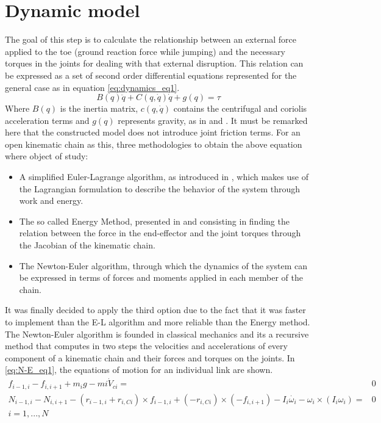 \section{Dynamic model}
\label{sec_dynamic_model}
The goal of this step is to calculate the relationship between an external force applied to the toe (ground reaction force while jumping) and the necessary torques in the joints for dealing with that external disruption.
This relation can be expressed as a set of second order differential equations represented for the general case as in equation \ref{eq:dynamics_eq1}. 
\begin{equation}
	\label{eq:dynamics_eq1}
	B(q)\ddot{q} + C(q,\dot{q})\dot{q} + g(q) = \tau
\end{equation}
Where $B(q)$ is the inertia matrix, $c(q,\dot{q})$ contains the centrifugal and coriolis acceleration terms and $g(q)$ represents gravity, as in \cite{dynamics1} and \cite{dynamics2}. 
It must be remarked here that the constructed model does not introduce joint friction terms.
For an open kinematic chain as this, three methodologies to obtain the above equation where object of study:
\begin{itemize}
	\item A simplified Euler-Lagrange algorithm, as introduced in \cite{E-L1}, which makes use of the Lagrangian formulation to describe the behavior of the system through work and energy.
	\item The so called Energy Method, presented in \cite{asada} and consisting in finding the relation between the force in the end-effector and the joint torques through the Jacobian of the kinematic chain.
	\item The Newton-Euler algorithm, through which the dynamics of the system can be expressed in terms of forces and moments applied in each member of the chain.
\end{itemize}
It was finally decided to apply the third option due to the fact that it was faster to implement than the E-L algorithm and more reliable than the Energy method.
The Newton-Euler algorithm is founded in classical mechanics and its a recursive method that computes in two steps the velocities and accelerations of every component of a kinematic chain and their forces and torques on the joints.
In \ref{eq:N-E_eq1}, the equations of motion for an individual link are shown.
\begin{equation}
\label{eq:N-E_eq1}
	\begin{aligned}
		f_{i-1, i} - f_{i,i+1} + m_{i} g - m{i} \dot{V}_{ci} =& 0 \\
		N_{i - 1 , i} - N_{i , i + 1} - ( r_{i - 1 , i} + r_{i , Ci} ) \times f_{i - 1 , i} + ( - r_{i , Ci} ) \times ( - f_{i , i + 1}) - I_{i} \dot{\omega_{i}} - \omega_{i} \times ( I_{i} \omega_{i} ) =& 0 \\
		i = 1,..., N 
	\end{aligned}
\end{equation}
